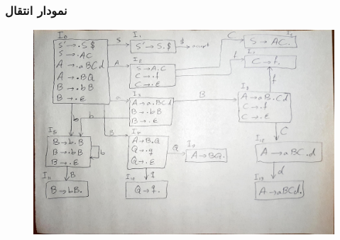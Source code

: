 \documentclass{article}
\begin{document}
\subsubsection{نمودار انتقال}
\begin{figure}[H]
    \centering
    \includegraphics[width=1.0\textwidth]{figures/5.jpg}
    \caption
	{}
    \label{fig:fig1}
\end{figure}
\end{document}
